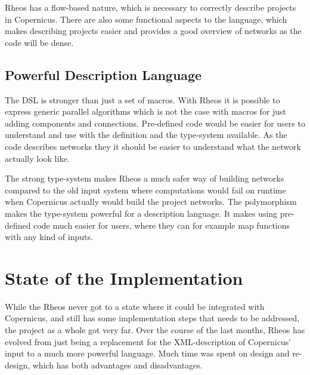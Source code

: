 Rheos has a flow-based nature, which is necessary to correctly
describe projects in Copernicus. There are also some functional
aspects to the language, which makes describing projects easier and
provides a good overview of networks as the code will be dense.


\subsection{Powerful Description Language}
The DSL is stronger than just a set of macros. With Rheos it is
possible to express generic parallel algorithms which is not the case
with macros for just adding components and connections. Pre-defined
code would be easier for users to understand and use with the
definition and the type-system available. As the code describes
networks they it should be easier to understand what the network
actually look like. 

The strong type-system makes Rheos a much safer way of building
networks compared to the old input system where computations would
fail on runtime when Copernicus actually would build the project
networks. The polymorphism makes the type-system powerful for a
description language. It makes using pre-defined code much easier for
users, where they can for example map functions with any kind of
inputs.

\section{State of the Implementation}
While the Rheos never got to a state where it could be integrated with
Copernicus, and still has some implementation steps that needs to be
addressed, the project as a whole got very far. Over the course of the
last months, Rheos has evolved from just being a replacement for the
XML-description of Copernicus' input to a much more powerful
language. Much time was spent on design and re-design, which has both
advantages and disadvantages.
